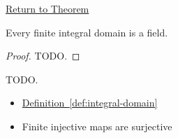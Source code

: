 \newpage
{}
\label{prf:finite-integral-domain-is-field}

\begin{remark*}[Return]
\hyperref[thm:finite-integral-domain-is-field]{Return to Theorem}
\end{remark*}

\begin{theorem*}
Every finite integral domain is a field.
\end{theorem*}

\begin{proof}
TODO.
\end{proof}

\begin{remark*}
TODO.
\end{remark*}

\begin{dependencies}
\begin{itemize}
  \item \hyperref[def:integral-domain]{Definition~\ref*{def:integral-domain}}
  \item Finite injective maps are surjective
\end{itemize}
\end{dependencies}
